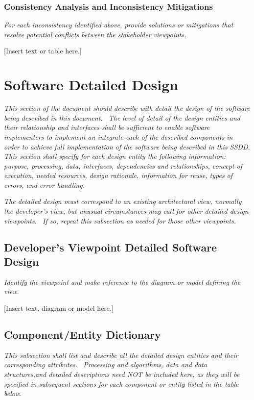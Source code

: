 \documentclass[twoside,letterpaper]{article}
\begin{document}
\subsubsection{Consistency Analysis and Inconsistency Mitigations}
{\itshape\color{black}
For each inconsistency identified above, provide solutions or
mitigations that resolve potential conflicts between the stakeholder
viewpoints.}

{\color{black}
[Insert text or table here.]}

\section{Software Detailed Design}
{\itshape\color{black}
This section of the document should describe with detail the design of
the software being described in this document. \ The level of detail of
the design entities and their relationship and interfaces shall be
sufficient to enable software implementers to implement an integrate
each of the described components in order to achieve full
implementation of the software being described in this SSDD. This
section shall specify for each design entity the following information:
purpose, processing, data, interfaces, dependencies and relationships,
concept of execution, needed resources, design rationale, information
for reuse, types of errors, and error handling. \ }


\bigskip

{\itshape\color{black}
The detailed design must correspond to an existing architectural view,
normally the developer{\textquoteright}s view, but unusual
circumstances may call for other detailed design viewpoints. \ If so,
repeat this subsection as needed for those other viewpoints.}

\subsection{Developer's Viewpoint Detailed Software Design}
{\itshape\color{black}
Identify the viewpoint and make reference to the diagram or model
defining the view.}

[Insert text, diagram or model here.]

\subsection{Component/Entity Dictionary}
{\itshape\color{black}
This subsection shall list and describe all the detailed design entities
and their corresponding attributes. \ Processing and algorithms, data
and data structures,and detailed descriptions need NOT be included
here, as they will be specified in subsequent sections for each
component or entity listed in the table below.}
\end{document}
